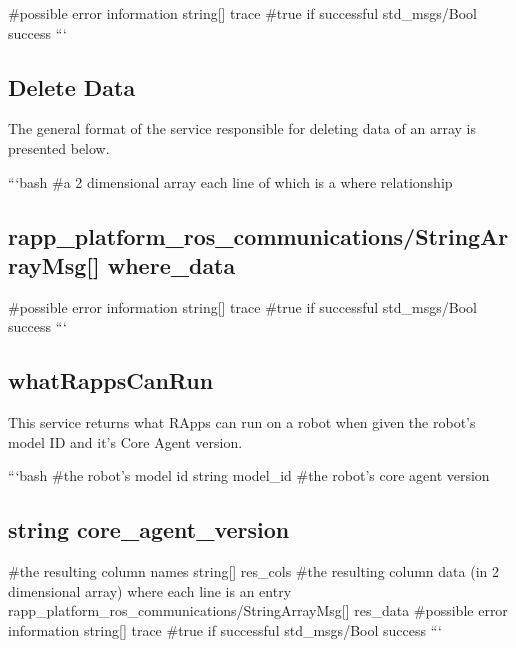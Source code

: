 \#possible error information string\mbox{[}\mbox{]} trace \#true if successful std\-\_\-msgs/\-Bool success ```

\subsection*{Delete Data}

The general format of the service responsible for deleting data of an array is presented below.

```bash \#a 2 dimensional array each line of which is a where relationship \subsection*{rapp\-\_\-platform\-\_\-ros\-\_\-communications/\-String\-Array\-Msg\mbox{[}\mbox{]} where\-\_\-data }

\#possible error information string\mbox{[}\mbox{]} trace \#true if successful std\-\_\-msgs/\-Bool success ```

\subsection*{what\-Rapps\-Can\-Run}

This service returns what R\-Apps can run on a robot when given the robot's model I\-D and it's Core Agent version.

```bash \#the robot's model id string model\-\_\-id \#the robot's core agent version \subsection*{string core\-\_\-agent\-\_\-version }

\#the resulting column names string\mbox{[}\mbox{]} res\-\_\-cols \#the resulting column data (in 2 dimensional array) where each line is an entry rapp\-\_\-platform\-\_\-ros\-\_\-communications/\-String\-Array\-Msg\mbox{[}\mbox{]} res\-\_\-data \#possible error information string\mbox{[}\mbox{]} trace \#true if successful std\-\_\-msgs/\-Bool success ``` 